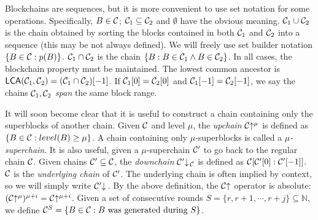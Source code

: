 Blockchains are sequences, but it is more convenient to use set notation for
some operations. Specifically, $B \in \mathcal{C}$; $\mathcal{C}_1 \subseteq \mathcal{C}_2$ and
$\emptyset$ have the obvious meaning. $\mathcal{C}_1 \cup \mathcal{C}_2$ is the chain
obtained by sorting the blocks contained in both $\mathcal{C}_1$ and $\mathcal{C}_2$ into
a sequence (this may be not always defined).
We will freely use set builder notation $\{B \in \mathcal{C}: p(B)\}$.
$\mathcal{C}_1 \cap \mathcal{C}_2$ is the
chain $\{B: B \in \mathcal{C}_1 \land B \in \mathcal{C}_2\}$. In all cases, the
blockchain property must be maintained. The lowest common ancestor is
$\textsf{LCA}(\mathcal{C}_1,
\mathcal{C}_2) = (\mathcal{C}_1 \cap \mathcal{C}_2)[-1]$.
If $\mathcal{C}_1[0] = \mathcal{C}_2[0]$ and $\mathcal{C}_1[-1] = \mathcal{C}_2[-1]$, we say the
chains $\mathcal{C}_1, \mathcal{C}_2$ \textit{span} the same block range.

It will soon become clear that it is useful to construct a chain containing only
the superblocks of another chain. Given $\mathcal{C}$ and level $\mu$, the
\textit{upchain} $\mathcal{C}\negthickspace\uparrow^\mu$ is defined as $\{B \in \mathcal{C}: level(B) \geq \mu\}$.
A chain containing only $\mu$-superblocks is called a $\mu$\textit{-superchain}. It is
also useful, given a $\mu$-superchain $\mathcal{C}'$ to go back to the regular chain
$\mathcal{C}$. Given chains $\mathcal{C}' \subseteq \mathcal{C}$, the \textit{downchain}
$\mathcal{C}'\negthickspace\downarrow\,\!\!_{\mathcal{C}}$ is defined as $\mathcal{C}[\mathcal{C}'[0]:\mathcal{C}'[-1]]$. $\mathcal{C}$
is the \textit{underlying chain} of $\mathcal{C}'$. The underlying chain is often
implied by context, so we will simply write $\mathcal{C}'\negthickspace\downarrow\,$. By the above
definition, the $\mathcal{C}\negthickspace\uparrow$ operator is absolute:
$(\mathcal{C}\negthickspace\uparrow^\mu)^{\mu + i} = \mathcal{C}\negthickspace\uparrow^{\mu + i}$. Given a set of
consecutive rounds $S = \{r, r + 1, \cdots, r + j\} \subseteq \mathbb{N}$, we define $\mathcal{C}^S = \{B
\in \mathcal{C}: B \text{ was generated during } S\}$.

